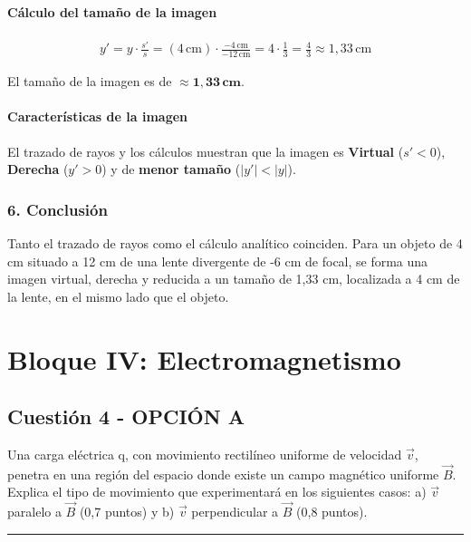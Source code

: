 \paragraph{Cálculo del tamaño de la imagen}
\begin{gather}
    y' = y \cdot \frac{s'}{s} = (4 \, \text{cm}) \cdot \frac{-4 \, \text{cm}}{-12 \, \text{cm}} = 4 \cdot \frac{1}{3} = \frac{4}{3} \approx 1,33 \, \text{cm}
\end{gather}
\begin{cajaresultado}
El tamaño de la imagen es de $\boldsymbol{\approx 1,33 \, \textbf{cm}}$.
\end{cajaresultado}
\paragraph{Características de la imagen}
El trazado de rayos y los cálculos muestran que la imagen es \textbf{Virtual} ($s'<0$), \textbf{Derecha} ($y'>0$) y de \textbf{menor tamaño} ($|y'|<|y|$).

\subsubsection*{6. Conclusión}
\begin{cajaconclusion}
Tanto el trazado de rayos como el cálculo analítico coinciden. Para un objeto de 4 cm situado a 12 cm de una lente divergente de -6 cm de focal, se forma una imagen virtual, derecha y reducida a un tamaño de 1,33 cm, localizada a 4 cm de la lente, en el mismo lado que el objeto.
\end{cajaconclusion}

\newpage

\section{Bloque IV: Electromagnetismo}
\label{sec:em_2009_sep_ext}

\subsection{Cuestión 4 - OPCIÓN A}
\label{subsec:4A_2009_sep_ext}

\begin{cajaenunciado}
Una carga eléctrica q, con movimiento rectilíneo uniforme de velocidad $\vec{v}$, penetra en una región del espacio donde existe un campo magnético uniforme $\vec{B}$. Explica el tipo de movimiento que experimentará en los siguientes casos: a) $\vec{v}$ paralelo a $\vec{B}$ (0,7 puntos) y b) $\vec{v}$ perpendicular a $\vec{B}$ (0,8 puntos).
\end{cajaenunciado}
\hrule

